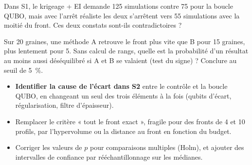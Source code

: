 \exercices
\begin{exercice}
Dans S1, le krigeage + EI demande 125 simulations contre 75 pour la boucle QUBO, mais avec l'arrêt réaliste les deux s'arrêtent vers 55 simulations avec la moitié du front. Ces deux constats sont-ils contradictoires ?
\end{exercice}
\begin{exercice}
Sur 20 graines, une méthode A retrouve le front plus vite que B pour 15 graines, plus lentement pour 5. Sans calcul de rangs, quelle est la probabilité d'un résultat au moins aussi déséquilibré si A et B se valaient (test du signe) ? Conclure au seuil de 5~\%.
\end{exercice}

\begin{pistes}
\begin{itemize}
\item \textbf{Identifier la cause de l'écart dans S2} entre le contrôle et la boucle QUBO, en changeant un seul des trois éléments à la fois (qubits d'écart, régularisation, filtre d'épaisseur).
\item Remplacer le critère « tout le front exact », fragile pour des fronts de 4 et 10 profils, par l'hypervolume ou la distance au front en fonction du budget.
\item Corriger les valeurs de $p$ pour comparaisons multiples (Holm), et ajouter des intervalles de confiance par rééchantillonnage sur les médianes.
\end{itemize}
\end{pistes}
